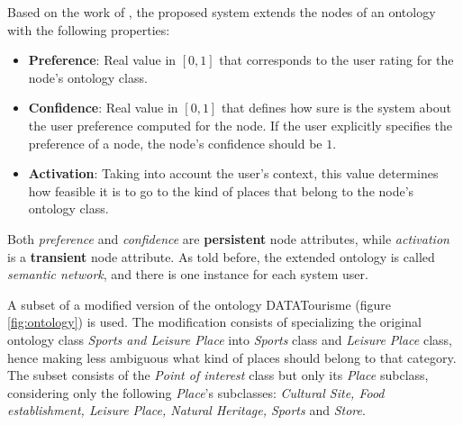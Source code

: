 Based on the work of \cite{bahramian_abbaspour_claramunt_2017}, the proposed system extends the nodes of an ontology with the following properties:
\begin{itemize}
    \item \textbf{Preference}: Real value in $[0, 1]$ that corresponds to the user rating for the node's ontology class.
    \item \textbf{Confidence}: Real value in $[0, 1]$ that defines how sure is the system about the user preference computed for the node. If the user explicitly specifies the preference of a node, the node's confidence should be $1$.
    \item \textbf{Activation}: Taking into account the user's context, this value determines how feasible it is to go to the kind of places that belong to the node's ontology class.
\end{itemize}{}
Both \textit{preference} and \textit{confidence} are \textbf{persistent} node attributes, while \textit{activation} is a \textbf{transient} node attribute. As told before, the extended ontology is called \textit{semantic network}, and there is one instance for each system user.

A subset of a modified version of the ontology DATATourisme (figure \ref{fig:ontology}) is used. The modification consists of specializing the original ontology class \textit{Sports and Leisure Place} into \textit{Sports} class and \textit{Leisure Place} class, hence making less ambiguous what kind of places should belong to that category. The subset consists of the \textit{Point of interest} class but only its \textit{Place} subclass, considering only the following \textit{Place}'s subclasses: \textit{Cultural Site, Food establishment, Leisure Place, Natural Heritage, Sports} and \textit{Store}. 

